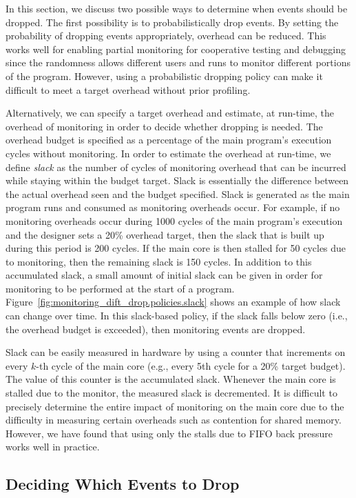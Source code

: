 In this section, we discuss two possible ways to determine when events should
be dropped.  The first possibility is to probabilistically drop events. By
setting the probability of dropping events appropriately, overhead can be
reduced. This works well for enabling partial monitoring for cooperative
testing and debugging since the randomness allows different users and runs to
monitor different portions of the program. However, using a probabilistic
dropping policy can make it difficult to meet a target overhead without prior
profiling.

Alternatively, we can specify a target overhead and estimate, at run-time, the
overhead of monitoring in order to decide whether dropping is needed.  The
overhead budget is specified as a percentage of the main program's execution
cycles without monitoring. In order to estimate the overhead at run-time, we
define \emph{slack} as the number of cycles of monitoring overhead that can be
incurred while staying within the budget target. Slack is essentially the
difference between the actual overhead seen and the budget specified. Slack is
generated as the main program runs and consumed as monitoring overheads occur.
For example, if no monitoring overheads occur during 1000 cycles of the main
program's execution and the designer sets a 20\% overhead target, then the
slack that is built up during this period is 200 cycles. If the main core is
then stalled for 50 cycles due to monitoring, then the remaining slack is 150
cycles.  In addition to this accumulated slack, a small amount of initial slack
can be given in order for monitoring to be performed at the start of a program.
Figure~\ref{fig:monitoring_dift_drop.policies.slack} shows an example of how
slack can change over time.  In this slack-based policy, if the slack falls
below zero (i.e., the overhead budget is exceeded), then monitoring events are
dropped.

Slack can be easily measured in hardware by using a counter that increments on
every $k$-th cycle of the main core (e.g., every 5th cycle for a 20\% target
budget). The value of this counter is the accumulated slack. Whenever the main
core is stalled due to the monitor, the measured slack is decremented. It is
difficult to precisely determine the entire impact of monitoring on the main
core due to the difficulty in measuring certain overheads such as contention
for shared memory. However, we have found that using only the stalls due to
FIFO back pressure works well in practice.

\subsection{Deciding Which Events to Drop} 
\label{sec:monitoring_dift_drop.policies.which}

